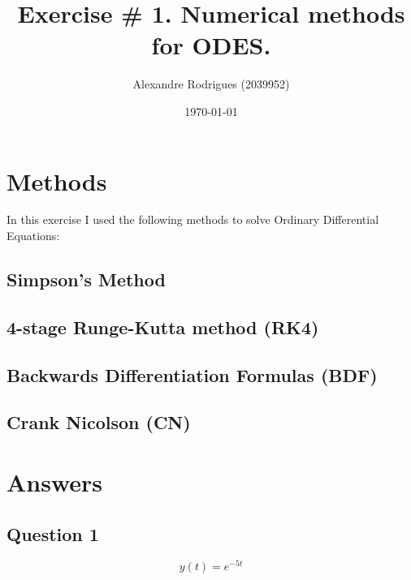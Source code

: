 \documentclass[a4paper, 11pt]{article}
\begin{document}
	
	\title{Exercise \# 1. Numerical methods for ODES. }
	\author{{\small Alexandre Rodrigues (2039952)}}
	\date{\today}
	
	\maketitle
	
	
	\section*{Methods}
		In this exercise I used the following methods to solve Ordinary Differential Equations:
		
		\subsection*{Simpson's Method}
		
		\subsection*{4-stage Runge-Kutta method (RK4)}
		
		\subsection*{Backwards Differentiation Formulas (BDF)}
		
		\subsection*{Crank Nicolson (CN)}
		
		
	
	
	\section*{Answers}
		\subsection*{Question 1}
		
		\begin{equation}
			y(t) = e^{-5t}
		\end{equation}
		
\end{document}

